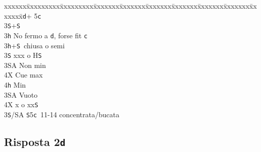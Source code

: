 \documentclass[a4paper,italian]{article}
\newcommand{\BS}{\small{\texttt{S}}}
\newcommand{\BC}{\small{\texttt{c}}}
\newcommand{\BD}{\small{\texttt{d}}}
\newcommand{\BH}{\small{\texttt{h}}}
\newcommand{\pdfd}{\texorpdfstring{\texttt{d}}{D}}
\newenvironment{bidtable}
{\begin{tabbing}

    xxxxxx\=xxxxxxxxx\=xxxxxxxxx\=xxxxxxx\=xxxxxxx\=xxxxxxx\=xxxxxxx\=xxxxxxx\=xxxxxxx\=xxxxxxx\=\kill}
{\end{tabbing} }%
\begin{document}
\begin{multicols}{2}
\begin{bidtable}
        3\BD {}+ 5\BC \+\\
        3\BS {}+\BS \\
        3\BH \> No fermo a \BD , forse fit \BC \-\\
        3\BH {}+\BS\ chiusa o semi\+\\
        3\BS \> xxx o H\BS \+\\
        3\small{SA} \> Non min\\
        4X \> Cue max\\
        4\BH \> Min\-\\
        3\small{SA} \> Vuoto\\
        4X \> x o xx\BS \-\\
        3\BS/SA \BS 5\BC\ 11-14 concentrata/bucata
    \end{bidtable}
\end{multicols}

\newpage

\subsection{Risposta 2\pdfd}
\end{document}
